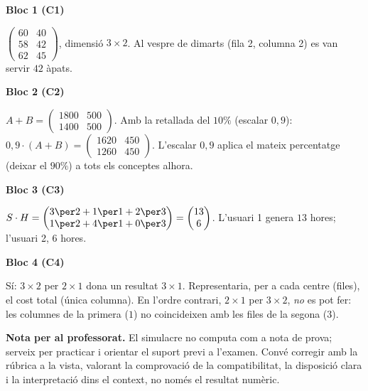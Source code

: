 \begin{solucions}
\textbf{Bloc 1 (C1)}
\begin{sollist}
  \item $\begin{pmatrix} 60 & 40 \\ 58 & 42 \\ 62 & 45 \end{pmatrix}$,
        \;dimensió $3\times 2$. Al vespre de dimarts (fila 2, columna 2) es van
        servir $42$ àpats.
\end{sollist}

\textbf{Bloc 2 (C2)}
\begin{sollist}
  \item $A+B=\begin{pmatrix} 1800 & 500 \\ 1400 & 500 \end{pmatrix}$. Amb la
        retallada del $10\%$ (escalar $0{,}9$):
        $0{,}9\cdot(A+B)=\begin{pmatrix} 1620 & 450 \\ 1260 & 450 \end{pmatrix}$.
        L'escalar $0{,}9$ aplica el mateix percentatge (deixar el $90\%$) a tots els
        conceptes alhora.
\end{sollist}

\textbf{Bloc 3 (C3)}
\begin{sollist}
  \item $S\cdot H=\begin{pmatrix} 3\per 2+1\per 1+2\per 3 \\ 1\per 2+4\per 1+0\per 3 \end{pmatrix}
        =\begin{pmatrix} 13 \\ 6 \end{pmatrix}$. L'usuari 1 genera $13$ hores;
        l'usuari 2, $6$ hores.
\end{sollist}

\textbf{Bloc 4 (C4)}
\begin{sollist}
  \item Sí: $3\times 2$ per $2\times 1$ dona un resultat $3\times 1$. Representaria,
        per a cada centre (files), el cost total (única columna). En l'ordre
        contrari, $2\times 1$ per $3\times 2$, \emph{no} es pot fer: les columnes de
        la primera ($1$) no coincideixen amb les files de la segona ($3$).
\end{sollist}

\noindent\textbf{Nota per al professorat.} El simulacre no computa com a nota de
prova; serveix per practicar i orientar el suport previ a l'examen. Convé corregir
amb la rúbrica a la vista, valorant la comprovació de la compatibilitat, la
disposició clara i la interpretació dins el context, no només el resultat numèric.
\end{solucions}
